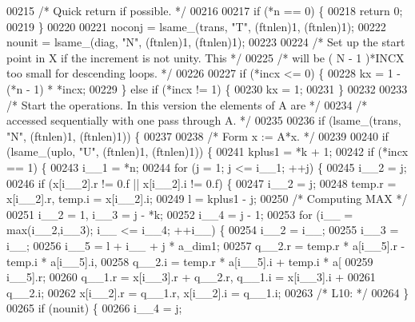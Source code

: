 \begin{DoxyCode}
00215 \textcolor{comment}{/*     Quick return if possible. */}
00216 
00217     \textcolor{keywordflow}{if} (*n == 0) \{
00218     \textcolor{keywordflow}{return} 0;
00219     \}
00220 
00221     noconj = lsame\_(trans, \textcolor{stringliteral}{"T"}, (ftnlen)1, (ftnlen)1);
00222     nounit = lsame\_(diag, \textcolor{stringliteral}{"N"}, (ftnlen)1, (ftnlen)1);
00223 
00224 \textcolor{comment}{/*     Set up the start point in X if the increment is not unity. This */}
00225 \textcolor{comment}{/*     will be  ( N - 1 )*INCX   too small for descending loops. */}
00226 
00227     \textcolor{keywordflow}{if} (*incx <= 0) \{
00228     kx = 1 - (*n - 1) * *incx;
00229     \} \textcolor{keywordflow}{else} \textcolor{keywordflow}{if} (*incx != 1) \{
00230     kx = 1;
00231     \}
00232 
00233 \textcolor{comment}{/*     Start the operations. In this version the elements of A are */}
00234 \textcolor{comment}{/*     accessed sequentially with one pass through A. */}
00235 
00236     \textcolor{keywordflow}{if} (lsame\_(trans, \textcolor{stringliteral}{"N"}, (ftnlen)1, (ftnlen)1)) \{
00237 
00238 \textcolor{comment}{/*         Form  x := A*x. */}
00239 
00240     \textcolor{keywordflow}{if} (lsame\_(uplo, \textcolor{stringliteral}{"U"}, (ftnlen)1, (ftnlen)1)) \{
00241         kplus1 = *k + 1;
00242         \textcolor{keywordflow}{if} (*incx == 1) \{
00243         i\_\_1 = *n;
00244         \textcolor{keywordflow}{for} (j = 1; j <= i\_\_1; ++j) \{
00245             i\_\_2 = j;
00246             \textcolor{keywordflow}{if} (x[i\_\_2].r != 0.f || x[i\_\_2].i != 0.f) \{
00247             i\_\_2 = j;
00248             temp.r = x[i\_\_2].r, temp.i = x[i\_\_2].i;
00249             l = kplus1 - j;
00250 \textcolor{comment}{/* Computing MAX */}
00251             i\_\_2 = 1, i\_\_3 = j - *k;
00252             i\_\_4 = j - 1;
00253             \textcolor{keywordflow}{for} (i\_\_ = max(i\_\_2,i\_\_3); i\_\_ <= i\_\_4; ++i\_\_) \{
00254                 i\_\_2 = i\_\_;
00255                 i\_\_3 = i\_\_;
00256                 i\_\_5 = l + i\_\_ + j * a\_dim1;
00257                 q\_\_2.r = temp.r * a[i\_\_5].r - temp.i * a[i\_\_5].i, 
00258                     q\_\_2.i = temp.r * a[i\_\_5].i + temp.i * a[
00259                     i\_\_5].r;
00260                 q\_\_1.r = x[i\_\_3].r + q\_\_2.r, q\_\_1.i = x[i\_\_3].i + 
00261                     q\_\_2.i;
00262                 x[i\_\_2].r = q\_\_1.r, x[i\_\_2].i = q\_\_1.i;
00263 \textcolor{comment}{/* L10: */}
00264             \}
00265             \textcolor{keywordflow}{if} (nounit) \{
00266                 i\_\_4 = j;

\end{DoxyCode}
